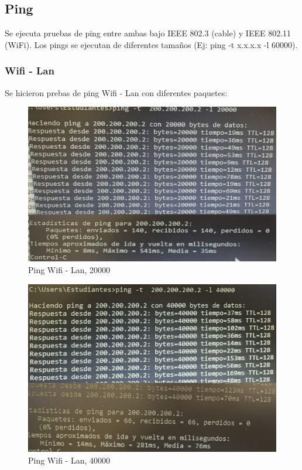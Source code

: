 \subsection{Ping}
Se ejecuta pruebas de ping entre ambas bajo IEEE 802.3 (cable) y IEEE 802.11 (WiFi). Los pings se ejecutan de diferentes tamaños (Ej: ping -t x.x.x.x -l 60000).\\

\subsubsection{\textbf{Wifi - Lan}}
Se hicieron prebas de ping Wifi - Lan con diferentes paquetes:

    \begin{figure}[H]
        \centering
        \includegraphics[width=\columnwidth]{punto1/p1_ping_wifi_lan_20k.jpeg}
        \caption{Ping Wifi - Lan, 20000}
        \label{fig:ping_wifi_lan_20k}
    \end{figure}

    \begin{figure}[H]
        \centering
        \includegraphics[width=\columnwidth]{punto1/p1_ping_wifi_lan_40k.jpeg}
        \caption{Ping Wifi - Lan, 40000}
        \label{fig:ping_wifi_lan_40k}
    \end{figure}

